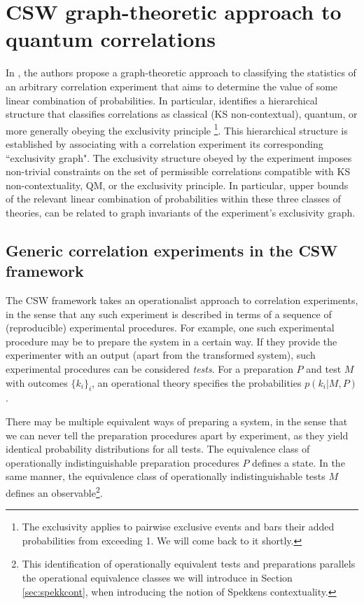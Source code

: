 \chapter{CSW graph-theoretic approach to quantum correlations}
\label{sec:csw}

In \cite{Cabello2014}, the authors propose a graph-theoretic approach to classifying the statistics of an arbitrary correlation experiment that aims to determine the value of some linear combination of probabilities. In particular, \cite{Cabello2014} identifies a hierarchical structure that classifies correlations as classical (KS non-contextual), quantum, or more generally obeying the exclusivity principle \footnote{The exclusivity applies to pairwise exclusive events and bars their added probabilities from exceeding 1. We will come back to it shortly.}. This hierarchical structure is established by associating with a correlation experiment its corresponding ``exclusivity graph". The exclusivity structure obeyed by the experiment imposes non-trivial constraints on the set of permissible correlations compatible with KS non-contextuality, QM, or the exclusivity principle. In particular, upper bounds of the relevant linear combination of probabilities within these three classes of theories, can be related to graph invariants of the experiment's exclusivity graph.

\section{Generic correlation experiments in the CSW framework}
\label{sec:correxp}
The CSW framework takes an operationalist approach to correlation experiments, in the sense that any such experiment is described in terms of a sequence of (reproducible) experimental procedures. For example, one such experimental procedure may be to prepare the system in a certain way. If they provide the experimenter with an output (apart from the transformed system), such experimental procedures can be considered \emph{tests}. For a preparation $P$ and test $M$ with outcomes $\{k_i\}_i$, an operational theory specifies the probabilities $p(k_i\vert M,P)$. 

There may be multiple equivalent ways of preparing a system, in the sense that we can never tell the preparation procedures apart by experiment, as they yield identical probability distributions for all tests. The equivalence class of operationally indistinguishable preparation procedures $P$ defines a state. In the same manner, the equivalence class of operationally indistinguishable tests $M$ defines an observable\footnote{This identification of operationally equivalent tests and preparations parallels the operational equivalence classes we will introduce in Section \ref{sec:spekkcont}, when introducing the notion of  Spekkens contextuality.}.


